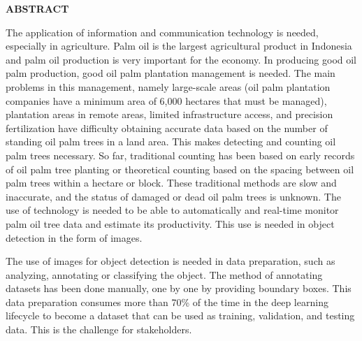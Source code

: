 \newpage %
\begin{center}
 
 

\vspace{10mm}
\begin{large}\textbf{ABSTRACT}\end{large}
\end{center}
\vspace{5mm}

\begin{singlespace}
The application of information and communication technology is needed, especially in agriculture. Palm oil is the largest agricultural product in Indonesia and palm oil production is very important for the economy. In producing good oil palm production, good oil palm plantation management is needed. The main problems in this management, namely large-scale areas (oil palm plantation companies have a minimum area of 6,000 hectares that must be managed), plantation areas in remote areas, limited infrastructure access, and precision fertilization have difficulty obtaining accurate data based on the number of standing oil palm trees in a land area. This makes detecting and counting oil palm trees necessary. So far, traditional counting has been based on early records of oil palm tree planting or theoretical counting based on the spacing between oil palm trees within a hectare or block. These traditional methods are slow and inaccurate, and the status of damaged or dead oil palm trees is unknown. The use of technology is needed to be able to automatically and real-time monitor palm oil tree data and estimate its productivity. This use is needed in object detection in the form of images.

The use of images for object detection is needed in data preparation, such as analyzing, annotating or classifying the object. The method of annotating datasets has been done manually, one by one by providing boundary boxes. This data preparation consumes more than 70\% of the time in the deep learning lifecycle to become a dataset that can be used as training, validation, and testing data. This is the challenge for stakeholders.


\end{singlespace}
